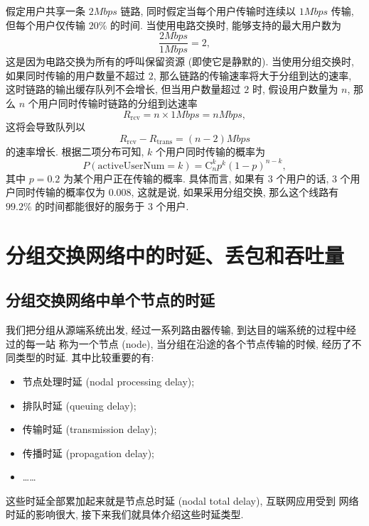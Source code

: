 \documentclass[10pt,UTF8]{book} %
\begin{document}
\begin{example}
    假定用户共享一条 $2\si{Mbps}$ 链路, 同时假定当每个用户传输时连续以
    $1 \si{Mbps}$ 传输, 但每个用户仅传输 $20\%$ 的时间.
    当使用电路交换时, 能够支持的最大用户数为
    \[ \dfrac{2\si{Mbps}}{1\si{Mbps}} = 2, \]
    这是因为电路交换为所有的呼叫保留资源 (即使它是静默的). 当使用分组交换时,
    如果同时传输的用户数量不超过 $2$, 那么链路的传输速率将大于分组到达的速率,
    这时链路的输出缓存队列不会增长, 但当用户数量超过 $2$ 时, 假设用户数量为 $n$,
    那么 $n$ 个用户同时传输时链路的分组到达速率
    \[ R_\mathrm{rcv} = n \times 1 \si{Mbps} = n\si{Mbps}, \]
    这将会导致队列以
    \[ R_\mathrm{rcv} - R_\mathrm{trans}
    = (n-2) \si{Mbps} \]
    的速率增长. 根据二项分布可知, $k$ 个用户同时传输的概率为
    \[ P(\mathrm{activeUserNum} = k)
    = \mathrm{C}_n^k p^k (1-p)^{n-k}, \]
    其中 $p=0.2$ 为某个用户正在传输的概率. 具体而言, 如果有 $3$ 个用户的话,
    $3$ 个用户同时传输的概率仅为 $0.008$, 这就是说, 如果采用分组交换,
    那么这个线路有 $99.2\%$ 的时间都能很好的服务于 $3$ 个用户.
\end{example}

\section{分组交换网络中的时延、丢包和吞吐量}

\subsection{分组交换网络中单个节点的时延}

我们把分组从源端系统出发, 经过一系列路由器传输, 到达目的端系统的过程中经过的每一站
称为一个节点 (node), 当分组在沿途的各个节点传输的时候, 经历了不同类型的时延.
其中比较重要的有:
\begin{itemize}[itemsep=0pt]
    \item 节点处理时延 (nodal processing delay);
    \item 排队时延 (queuing delay);
    \item 传输时延 (transmission delay);
    \item 传播时延 (propagation delay);
    \item ……
\end{itemize}
这些时延全部累加起来就是节点总时延 (nodal total delay), 互联网应用受到
网络时延的影响很大, 接下来我们就具体介绍这些时延类型.
\end{document}
